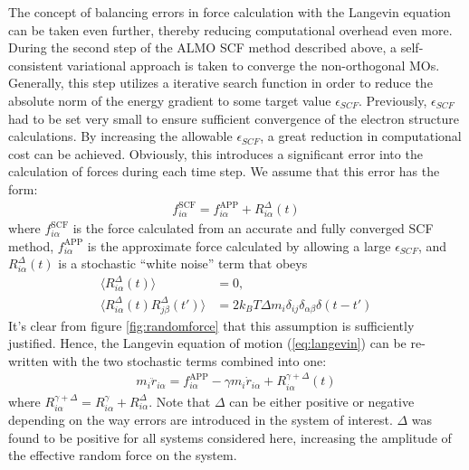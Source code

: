 \documentclass[aps,prl,reprint,amsmath,amssymb]{revtex4-1}
\begin{document}
The concept of balancing errors in force calculation with the Langevin equation can be taken even further, thereby reducing computational overhead even more. 
During the second step of the ALMO SCF method described above, a self-consistent variational approach is taken to converge the non-orthogonal MOs. 
Generally, this step utilizes a iterative search function in order to reduce the absolute norm of the energy gradient to some target value $\epsilon_{SCF}$. 
Previously, $\epsilon_{SCF}$ had to be set very small to ensure sufficient convergence of the electron structure calculations. 
By increasing the allowable $\epsilon_{SCF}$, a great reduction in computational cost can be achieved. 
Obviously, this introduces a significant error into the calculation of forces during each time step. 
We assume that this error has the form:
%
\begin{align}
\label{eq:assumption}
f^{\text{SCF}}_{i\alpha} = f^{\text{APP}}_{i\alpha} + R^{\Delta}_{i\alpha} (t)
\end{align}
%
where $f^{\text{SCF}}_{i\alpha}$ is the force calculated from an accurate and fully converged SCF method, $f^{\text{APP}}_{i\alpha}$ is the approximate force calculated by allowing a large $\epsilon_{SCF}$, and $R^{\Delta}_{i\alpha} (t)$ is a stochastic ``white noise'' term that obeys
%
\begin{align}
\label{eq:stochastic2}
\langle R^{\Delta}_{i\alpha} (t) \rangle &= 0, \\
\label{eq:stochastic3}
\langle R^{\Delta}_{i\alpha} (t)  R^{\Delta}_{j\beta} (t') \rangle &= 2 k_B T \Delta m_i \delta_{ij} \delta_{\alpha\beta} \delta(t-t')
\end{align}
%
It's clear from figure \ref{fig:randomforce} that this assumption is sufficiently justified. 
Hence, the Langevin equation of motion (\ref{eq:langevin}) can be re-written with the two stochastic terms combined into one:
%
\begin{align}
\label{eq:langevin2}
m_i \ddot{r}_{i\alpha} = f^{\text{APP}}_{i\alpha} - \gamma m_i \dot{r}_{i\alpha} + R^{\gamma + \Delta}_{i\alpha} (t)
\end{align}
%
where $R^{\gamma + \Delta}_{i\alpha} = R^{\gamma}_{i\alpha} + R^{\Delta}_{i\alpha}$. 
Note that $\Delta$ can be either positive or negative depending on the way errors are introduced in the system of interest. 
$\Delta$ was found to be positive for all systems considered here, increasing the amplitude of the effective random force on the system.

\end{document}
